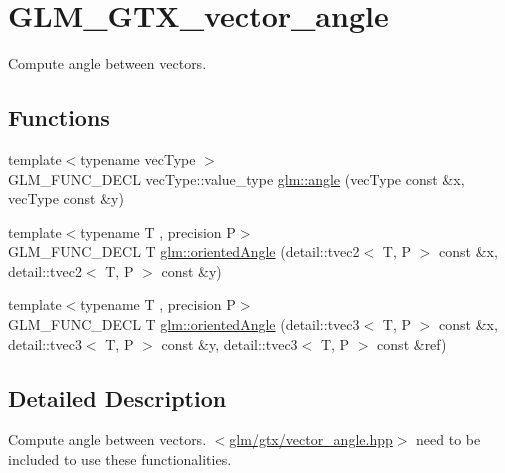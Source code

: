 \hypertarget{group__gtx__vector__angle}{\section{G\-L\-M\-\_\-\-G\-T\-X\-\_\-vector\-\_\-angle}
\label{group__gtx__vector__angle}
}


Compute angle between vectors.  


\subsection*{Functions}
\begin{DoxyCompactItemize}
\item 
{\footnotesize template$<$typename vec\-Type $>$ }\\G\-L\-M\-\_\-\-F\-U\-N\-C\-\_\-\-D\-E\-C\-L vec\-Type\-::value\-\_\-type \hyperlink{group__gtx__vector__angle_gab8691008a2536b681b711211816c14f7}{glm\-::angle} (vec\-Type const \&x, vec\-Type const \&y)
\item 
{\footnotesize template$<$typename T , precision P$>$ }\\G\-L\-M\-\_\-\-F\-U\-N\-C\-\_\-\-D\-E\-C\-L T \hyperlink{group__gtx__vector__angle_ga6f9cbae1b02b49ad92a1d0070649f038}{glm\-::oriented\-Angle} (detail\-::tvec2$<$ T, P $>$ const \&x, detail\-::tvec2$<$ T, P $>$ const \&y)
\item 
{\footnotesize template$<$typename T , precision P$>$ }\\G\-L\-M\-\_\-\-F\-U\-N\-C\-\_\-\-D\-E\-C\-L T \hyperlink{group__gtx__vector__angle_ga2aefc221dd5ed9fdacc17c28eea76775}{glm\-::oriented\-Angle} (detail\-::tvec3$<$ T, P $>$ const \&x, detail\-::tvec3$<$ T, P $>$ const \&y, detail\-::tvec3$<$ T, P $>$ const \&ref)
\end{DoxyCompactItemize}


\subsection{Detailed Description}
Compute angle between vectors. $<$\hyperlink{vector__angle_8hpp}{glm/gtx/vector\-\_\-angle.\-hpp}$>$ need to be included to use these functionalities. 

